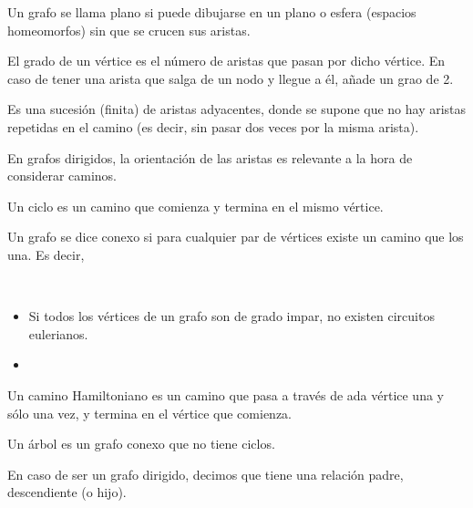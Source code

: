 \begin{definicion}
    Un grafo se llama plano si puede dibujarse en un plano o esfera (espacios homeomorfos) sin que se crucen sus aristas.
\end{definicion}

\begin{definicion}
    El grado de un vértice es el número de aristas que pasan por dicho vértice.
    En caso de tener una arista que salga de un nodo y llegue a él, añade un grao de 2.
\end{definicion}

\begin{definicion}[Camino]
    Es una sucesión (finita) de aristas adyacentes, donde se supone que no hay aristas repetidas en el camino (es decir, sin pasar dos veces por la misma arista).
\end{definicion}
En grafos dirigidos, la orientación de las aristas es relevante a la hora de considerar caminos.

\begin{definicion}[Ciclo]
   Un ciclo es un camino que comienza y termina en el mismo vértice. 
\end{definicion}

\begin{definicion}
    Un grafo se dice conexo si para cualquier par de vértices existe un camino que los una. Es decir, 
\end{definicion}

\begin{teo}
    \ 
    \begin{itemize}
        \item Si todos los vértices de un grafo son de grado impar, no existen circuitos eulerianos.
        \item 
    \end{itemize}
    
\end{teo}

\begin{definicion}
    Un camino Hamiltoniano es un camino que pasa a través de ada vértice una y sólo una vez, y termina en el vértice que comienza.
\end{definicion}

\begin{definicion}
    Un árbol es un grafo conexo que no tiene ciclos.
\end{definicion}
En caso de ser un grafo dirigido, decimos que tiene una relación padre, descendiente (o hijo).


